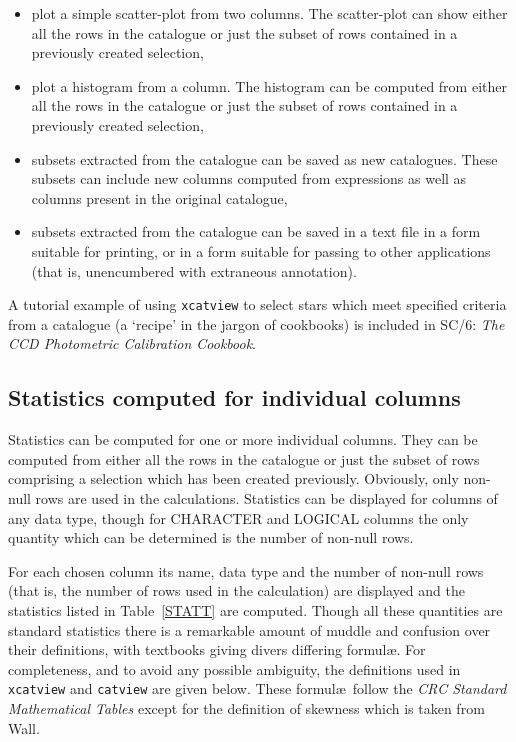 \documentclass[twoside,11pt]{article}
\newcommand{\xref}[3]{#1}
\renewcommand{\_}{\texttt{\symbol{95}}}
\begin{document}
\begin{itemize}
  \item plot a simple scatter-plot from two columns.  The scatter-plot
   can show either all the rows in the catalogue or just the subset of
   rows contained in a previously created selection,

  \item plot a histogram from a column.  The histogram can be computed
   from either all the rows in the catalogue or just the subset of rows
   contained in a previously created selection,

  \item subsets extracted from the catalogue can be saved as new
   catalogues. These subsets can include new columns computed from
   expressions as well as columns present in the original catalogue,

  \item subsets extracted from the catalogue can be saved in a text file
   in a form suitable for printing, or in a form suitable for passing
   to other applications (that is, unencumbered with extraneous
   annotation).

\end{itemize}

A tutorial example of using {\tt xcatview} to select stars which meet
specified criteria from a catalogue (a `recipe' in the jargon of
cookbooks) is included in \xref{SC/6: {\it The CCD Photometric Calibration
Cookbook}}{sc6}{}\cite{SC6}.


\subsection{\label{STATS}Statistics computed for individual columns}

Statistics can be computed for one or more individual columns.  They can
be computed from either all the rows in the catalogue or just the subset
of rows comprising a selection which has been created previously.  Obviously,
only non-null rows are used in the calculations.  Statistics can be
displayed for columns of any data type, though for CHARACTER and LOGICAL
columns the only quantity which can be determined is the number of
non-null rows.

For each chosen column its name, data type and the number of non-null rows 
(that is, the number of rows used in the calculation) are displayed and the
statistics listed in Table~\ref{STATT} are computed.  Though all these
quantities are standard statistics there is a remarkable amount of muddle
and confusion over their definitions, with textbooks giving divers
differing formul\ae.  For completeness, and to avoid any possible
ambiguity, the definitions used in {\tt xcatview} and {\tt catview} are
given below.  These formul\ae\ follow the {\it CRC Standard Mathematical
Tables}\/\cite{CRCMT} except for the definition of skewness which is taken
from Wall\cite{WALL79}.
\end{document}
